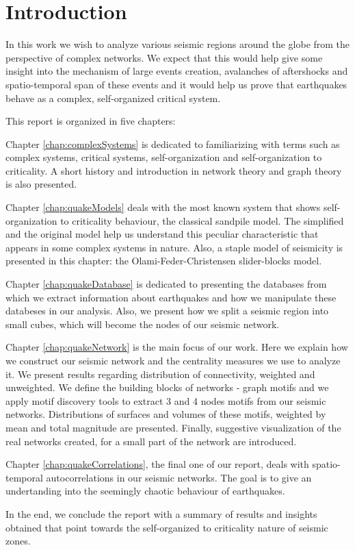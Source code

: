\chapter*{Introduction}

In this work we wish to analyze various seismic regions around the globe from the perspective of complex networks. We expect that this would help give some insight into the mechanism of large events creation, avalanches of aftershocks and spatio-temporal span of these events and it would help us prove that earthquakes behave as a complex, self-organized critical system.\par 
This report is organized in five chapters: \par 
Chapter \ref{chap:complexSystems} is dedicated to familiarizing with terms such as complex systems, critical systems, self-organization and self-organization to criticality. A short history and introduction in network theory and graph theory is also presented. \par 
Chapter \ref{chap:quakeModels} deals with the most known system that shows self-organization to criticality behaviour, the classical sandpile model. The simplified and the original model help us understand this peculiar characteristic that appears in some complex systems in nature. Also, a staple model of seismicity is presented in this chapter: the Olami-Feder-Christensen slider-blocks model. \par 
Chapter \ref{chap:quakeDatabase} is dedicated to presenting the databases from which we extract information about earthquakes and how we manipulate these databeses in our analysis. Also, we present how we split a seismic region into small cubes, which will become the nodes of our seismic network.\par
Chapter \ref{chap:quakeNetwork} is the main focus of our work. Here we explain how we construct our seismic network and the centrality measures we use to analyze it. We present results regarding distribution of connectivity, weighted and unweighted. We define the building blocks of networks - graph motifs and we apply motif discovery tools to extract 3 and 4 nodes motifs from our seismic networks. Distributions of surfaces and volumes of these motifs, weighted by mean and total magnitude are presented. Finally, suggestive visualization of the real networks created, for a small part of the network are introduced. \par 
Chapter \ref{chap:quakeCorrelations}, the final one of our report, deals with spatio-temporal autocorrelations in our seismic networks. The goal is to give an undertanding into the seemingly chaotic behaviour of earthquakes.\par 
In the end, we conclude the report with a summary of results and insights obtained that point towards the self-organized to criticality nature of seismic zones.


